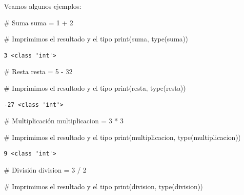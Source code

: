 \documentclass[
  spanish,
  letterpaper,
]{scrbook}
\newenvironment{Shaded}{\begin{snugshade}}{\end{snugshade}}
\newcommand{\BuiltInTok}[1]{\textcolor[rgb]{0.00,0.23,0.31}{#1}}
\newcommand{\CommentTok}[1]{\textcolor[rgb]{0.37,0.37,0.37}{#1}}
\newcommand{\DecValTok}[1]{\textcolor[rgb]{0.68,0.00,0.00}{#1}}
\newcommand{\NormalTok}[1]{\textcolor[rgb]{0.00,0.23,0.31}{#1}}
\newcommand{\OperatorTok}[1]{\textcolor[rgb]{0.37,0.37,0.37}{#1}}
\theoremstyle{definition}
\theoremstyle{remark}
\begin{document}
Veamos algunos ejemplos:

\begin{Shaded}
\begin{Highlighting}[]
\CommentTok{\# Suma}
\NormalTok{suma }\OperatorTok{=} \DecValTok{1} \OperatorTok{+} \DecValTok{2}

\CommentTok{\# Imprimimos el resultado y el tipo}
\BuiltInTok{print}\NormalTok{(suma, }\BuiltInTok{type}\NormalTok{(suma))}
\end{Highlighting}
\end{Shaded}

\begin{verbatim}
3 <class 'int'>
\end{verbatim}

\begin{Shaded}
\begin{Highlighting}[]
\CommentTok{\# Resta}
\NormalTok{resta }\OperatorTok{=} \DecValTok{5} \OperatorTok{{-}} \DecValTok{32}

\CommentTok{\# Imprimimos el resultado y el tipo}
\BuiltInTok{print}\NormalTok{(resta, }\BuiltInTok{type}\NormalTok{(resta))}
\end{Highlighting}
\end{Shaded}

\begin{verbatim}
-27 <class 'int'>
\end{verbatim}

\begin{Shaded}
\begin{Highlighting}[]
\CommentTok{\# Multiplicación}
\NormalTok{multiplicacion }\OperatorTok{=} \DecValTok{3} \OperatorTok{*} \DecValTok{3}

\CommentTok{\# Imprimimos el resultado y el tipo}
\BuiltInTok{print}\NormalTok{(multiplicacion, }\BuiltInTok{type}\NormalTok{(multiplicacion))}
\end{Highlighting}
\end{Shaded}

\begin{verbatim}
9 <class 'int'>
\end{verbatim}

\begin{Shaded}
\begin{Highlighting}[]
\CommentTok{\# División}
\NormalTok{division }\OperatorTok{=} \DecValTok{3} \OperatorTok{/} \DecValTok{2}

\CommentTok{\# Imprimimos el resultado y el tipo}
\BuiltInTok{print}\NormalTok{(division, }\BuiltInTok{type}\NormalTok{(division))}
\end{Highlighting}
\end{Shaded}
\end{document}

